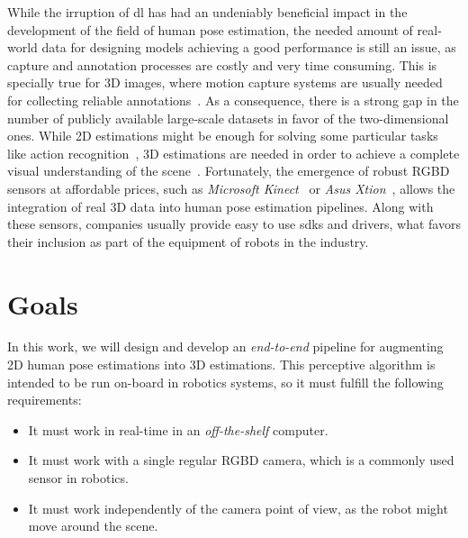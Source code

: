 While the irruption of \gls{dl} has had an undeniably beneficial impact in the development of the field of human pose estimation, the needed amount of real-world data for designing models achieving a good performance is still an issue, as capture and annotation processes are costly and very time consuming. This is specially true for 3D images, where motion capture systems are usually needed for collecting reliable annotations~\cite{ionescu2013human3, sigal2010humaneva}. As a consequence, there is a strong gap in the number of publicly available large-scale datasets in favor of the two-dimensional ones. While 2D estimations might be enough for solving some particular tasks like action recognition~\cite{liu2018recognizing}, 3D estimations are needed in order to achieve a complete visual understanding of the scene~\cite{Sarafianos2016}. Fortunately, the emergence of robust RGBD sensors at affordable prices, such as \emph{Microsoft Kinect}~\cite{zhang2012microsoft} or \emph{Asus Xtion}~\cite{xtion}, allows the integration of real 3D data into human pose estimation pipelines. Along with these sensors, companies usually provide easy to use \glspl{sdk} and drivers, what favors their inclusion as part of the equipment of robots in the industry.

\section{Goals}\label{sec:goals}
In this work, we will design and develop an \emph{end-to-end} pipeline for augmenting 2D human pose estimations into 3D estimations. This perceptive algorithm is intended to be run on-board in robotics systems, so it must fulfill the following requirements:
\begin{itemize}
    \item It must work in real-time in an \emph{off-the-shelf} computer.
    \item It must work with a single regular RGBD camera, which is a commonly used sensor in robotics.
    \item It must work independently of the camera point of view, as the robot might move around the scene.
\end{itemize}

